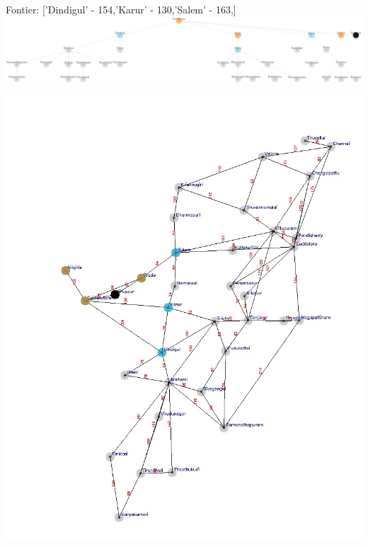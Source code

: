\documentclass[xcolor=table]{beamer}
\begin{document}
\begin{frame}
  { \tiny Fontier: ['Dindigul' - 154,'Karur' - 130,'Salem' - 163,]}
  \includegraphics[width=1\textwidth]{../UCSNodes/7-1.png}
  \begin{center}
    \includegraphics[height=0.6\textheight]{../UCSoutput/tamilUCS5.jpg}
  \end{center}
\end{frame}
\end{document}
